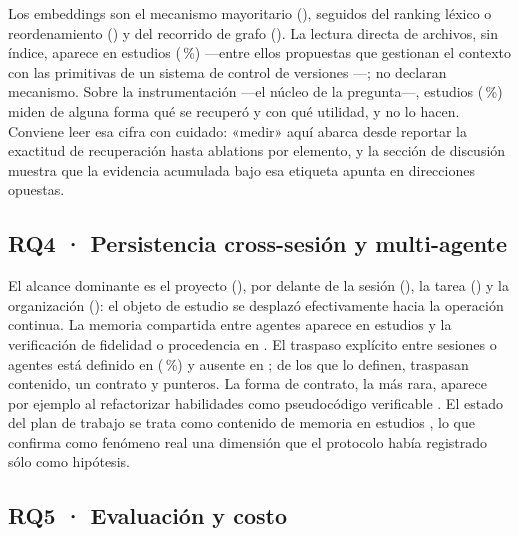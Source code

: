 \documentclass[conference]{IEEEtran}
\begin{document}
Los embeddings son el mecanismo mayoritario (\clRQtresEmbeddings{}), seguidos del ranking léxico o
reordenamiento (\clRQtresRanking{}) y del recorrido de grafo (\clRQtresGrafo{}). La lectura directa
de archivos, sin índice, aparece en \clRQtresGrep{} estudios (\clRQtresGrepPct{}\,\%) —entre ellos
propuestas que gestionan el contexto con las primitivas de un sistema de control de versiones
\cite{cW4416548137,cW7164974103}—;
\clRQtresRetrievalNa{} no declaran mecanismo. Sobre la instrumentación —el núcleo de la
pregunta—, \clRQtresMide{} estudios (\clRQtresMidePct{}\,\%) miden de alguna forma qué se recuperó y
con qué utilidad, y \clRQtresNoMide{} no lo hacen. Conviene leer esa cifra con cuidado: «medir» aquí
abarca desde reportar la exactitud de recuperación hasta ablations por elemento, y la sección de
discusión muestra que la evidencia acumulada bajo esa etiqueta apunta en direcciones opuestas.

\subsection{RQ4 · Persistencia cross-sesión y multi-agente}
\label{sec:rq4}

El alcance dominante es el proyecto (\clRQcuatroProyecto{}), por delante de la sesión
(\clRQcuatroSesion{}), la tarea (\clRQcuatroTarea{}) y la organización
(\clRQcuatroOrganizacion{}): el objeto de estudio se desplazó efectivamente hacia la operación
continua. La memoria compartida entre agentes aparece en \clRQcuatroMultiagente{} estudios y la
verificación de fidelidad o procedencia en \clRQcuatroFidelidad{}. El traspaso explícito entre
sesiones o agentes está definido en \clRQcuatroHandoff{} (\clRQcuatroHandoffPct{}\,\%) y ausente en
\clRQcuatroHandoffNo{}; de los que lo definen, \clRQcuatroHandoffContenido{} traspasan contenido,
\clRQcuatroHandoffContrato{} un contrato y \clRQcuatroHandoffPunteros{} punteros. La forma de contrato, la más rara, aparece por ejemplo al refactorizar habilidades como
pseudocódigo verificable \cite{cW7162818693}. El estado del plan de trabajo se trata como contenido
de memoria en \clRQcuatroPlanEstado{} estudios \cite{cW7164703964,cW7161204348}, lo que confirma
como fenómeno real una dimensión que el protocolo había registrado sólo como hipótesis.

\subsection{RQ5 · Evaluación y costo}
\label{sec:rq5}
\end{document}
